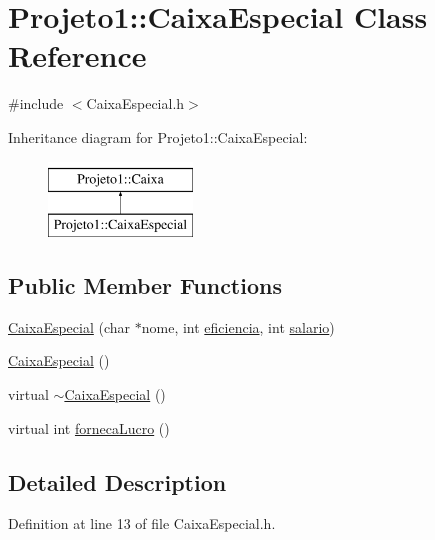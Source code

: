 \hypertarget{classProjeto1_1_1CaixaEspecial}{
\section{Projeto1::CaixaEspecial Class Reference}
\label{classProjeto1_1_1CaixaEspecial}
}


{\ttfamily \#include $<$CaixaEspecial.h$>$}

Inheritance diagram for Projeto1::CaixaEspecial:\begin{figure}[H]
\begin{center}
\leavevmode
\includegraphics[height=2.000000cm]{classProjeto1_1_1CaixaEspecial}
\end{center}
\end{figure}
\subsection*{Public Member Functions}
\begin{DoxyCompactItemize}
\item 
\hyperlink{classProjeto1_1_1CaixaEspecial_a020d92b4edabba47aa10e30bb05fdb18}{CaixaEspecial} (char $\ast$nome, int \hyperlink{classProjeto1_1_1Caixa_aeb2c7dca9680e644f88f3bb9eb606c2a}{eficiencia}, int \hyperlink{classProjeto1_1_1Caixa_ad9f8c9b65400bd1db9004dbb3c9f18ea}{salario})
\item 
\hyperlink{classProjeto1_1_1CaixaEspecial_aeeb286dd249248b99d8c41ce19b2ef19}{CaixaEspecial} ()
\item 
virtual \hyperlink{classProjeto1_1_1CaixaEspecial_a618c20e98a4c92da8915d5971b1dc585}{$\sim$CaixaEspecial} ()
\item 
virtual int \hyperlink{classProjeto1_1_1CaixaEspecial_a8b903f57784cc2f5025108db30939232}{fornecaLucro} ()
\end{DoxyCompactItemize}


\subsection{Detailed Description}


Definition at line 13 of file CaixaEspecial.h.



